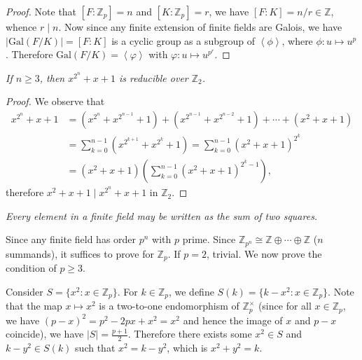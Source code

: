 \begin{proof}
Note that $[F:\mathbb{Z}_p]=n$ and $[K:\mathbb{Z}_p]=r$, we have $[F:K]=n/r\in\mathbb{Z}$, whence $r\mid n$. Now since any finite extension of finite fields are Galois, we have $|\mathrm{Gal}(F/K)|=[F:K]$ is a cyclic group as a subgroup of $\left<\phi\right>$, where $\phi:u\mapsto u^p$. Therefore $\mathrm{Gal}(F/K)=\left<\varphi\right>$ with $\varphi:u\mapsto u^{p^r}$.
\end{proof}
\begin{problem}\em
If $n\geq 3$, then $x^{2^n}+x+1$ is reducible over $\mathbb{Z}_2$.
\end{problem}
\begin{proof}
We observe that 
$$
\begin{aligned}
x^{2^n}+x+1&=\left( x^{2^n}+x^{2^{n-1}}+1 \right) +\left( x^{2^{n-1}}+x^{2^{n-2}}+1 \right) +\cdots +\left( x^2+x+1 \right) 
\\
&=\sum_{k=0}^{n-1}{\left( x^{2^{k+1}}+x^{2^k}+1 \right)}=\sum_{k=0}^{n-1}{\left( x^2+x+1 \right) ^{2^k}}
\\
&=\left( x^2+x+1 \right) \left( \sum_{k=0}^{n-1}{\left( x^2+x+1 \right) ^{2^k-1}} \right) ,
\end{aligned}
$$
therefore $x^2+x+1\mid x^{2^n}+x+1$ in $\mathbb{Z}_2$.
\end{proof}
\begin{problem}\em
Every element in a finite field may be written as the sum of two squares.
\end{problem}
Since any finite field has order $p^n$ with $p$ prime. Since $\mathbb{Z}_{p^n}\cong\mathbb{Z}\oplus\cdots\oplus\mathbb{Z}$ ($n$ summands), it suffices to prove for $\mathbb{Z}_p$. If $p=2$, trivial. We now prove the condition of $p\ge 3$.\par
Consider $S=\{x^2:x\in\mathbb{Z}_p\}$. For $k\in\mathbb{Z}_p$, we define $S(k)=\{k-x^2:x\in\mathbb{Z}_p\}$. Note that the map $x\mapsto x^2$ is a two-to-one endomorphism of $\mathbb{Z}_p^\times$ (since for all $x\in\mathbb{Z}_p$, we have $(p-x)^2=p^2-2px+x^2=x^2$ and hence the image of $x$ and $p-x$ coincide), we have $|S|=\frac{p+1}{2}$. Therefore there exists some $x^2\in S$ and $k-y^2\in S(k)$ such that $x^2=k-y^2$, which is $x^2+y^2=k$.
